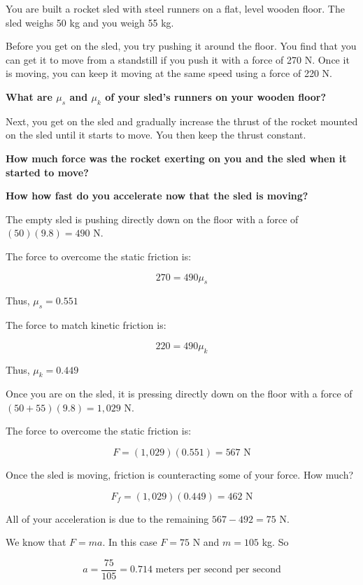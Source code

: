 \begin{Exercise}[title={Rocket Sled}, label=rocketsled1]
 
You are built a rocket sled with steel runners on a flat, level wooden floor. The sled weighs 50 kg and you weigh 55 kg.

Before you get on the sled,  you try pushing it around the floor. You find that you can get it to move from a
standstill if you push it with a force of 270 N.  Once it is moving, you can keep it moving at the same speed using a force of 220 N.

\textbf{What are $\mu_s$ and $\mu_k$ of your sled's runners on your wooden floor?}

Next, you get on the sled and gradually increase the thrust of the rocket mounted on the sled until it starts to move. You then keep the thrust constant.

\textbf{How much force was the rocket exerting on you and the sled when it started to move?}

\textbf{How how fast do you accelerate now that the sled is moving?}

\end{Exercise}
\begin{Answer}[ref=rocketsled1]

The empty sled is pushing directly down on the floor with a force of $(50)(9.8) = 490$ N.

The force to overcome the static friction is:

$$270 = 490 \mu_s$$

Thus, $\mu_s = 0.551$

The force to match kinetic friction is:

$$220 = 490 \mu_k$$

Thus, $\mu_k = 0.449$

Once you are on the sled, it is pressing directly down on the floor with a force of $(50 + 55)(9.8) = 1,029$ N.

The force to overcome the static friction is:

$$F = (1,029)(0.551) = 567 \text{ N}$$

Once the sled is moving, friction is counteracting some of your force. How much?

$$F_f = (1,029)(0.449) = 462 \text{ N}$$

All of your acceleration is due to the remaining $567 - 492 = 75$ N.

We know that $F = ma$. In this case $F = 75$ N and $m = 105$ kg. So

$$a = \frac{75}{105} = 0.714 \text{ meters per second per second}$$

\end{Answer}

